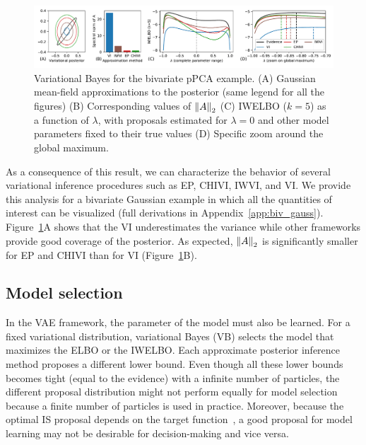 \begin{figure}
    \centering
    \includegraphics[width=\linewidth]{figures/theoryfull.pdf}
    \caption[Variational Bayes for the bivariate pPCA example.]{Variational Bayes for the bivariate pPCA example. (A) Gaussian mean-field approximations to the posterior (same legend for all the figures) (B) Corresponding values of $\left\lVert A\right\rVert_2$ (C) IWELBO ($k=5$) as a function of $\lambda$, with proposals estimated for $\lambda=0$ and other model parameters fixed to their true values (D) Specific zoom around the global maximum.}
    \label{fig:norm_A}
    \vspace{-0.3cm}
\end{figure}

As a consequence of this result, we can characterize the behavior of several variational inference procedures such as EP, CHIVI, IWVI, and VI. We provide this analysis for a bivariate Gaussian example in which all the quantities of interest can be visualized (full derivations in Appendix~\ref{app:biv_gauss}).
Figure~\ref{fig:norm_A}A shows that the VI underestimates the variance while other frameworks provide good coverage of the posterior. As expected, $\left\lVert A\right\rVert_2$ is significantly smaller for EP and CHIVI than for VI (Figure~\ref{fig:norm_A}B). 


\subsection{Model selection}
In the VAE framework, the parameter of the model must also be learned. For a fixed variational distribution, variational Bayes (VB) selects the model that maximizes the ELBO or the IWELBO. Each approximate posterior inference method proposes a different lower bound. Even though all these lower bounds becomes tight (equal to the evidence) with a infinite number of particles, the different proposal distribution might not perform equally for model selection because a finite number of particles is used in practice. Moreover, because the optimal IS proposal depends on the target function~\cite{mcbook}, a good proposal for model learning may not be desirable for decision-making and vice versa. 

